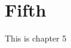\documentclass[../main]{subfiles}
\begin{document}
\chapter{Fifth}
\label{chap:fifth}

This is chapter 5
\end{document}
